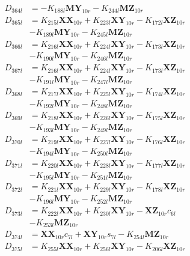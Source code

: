 \begin{multicols}{2}
\begin{align}
D_{364l} &= - K_{188l}\mathbf{MY}_{10r} - K_{244l}\mathbf{MZ}_{10r} \nonumber \\
D_{365l} &= K_{215l}\mathbf{XX}_{10r} + K_{223l}\mathbf{XY}_{10r} - K_{172l}\mathbf{XZ}_{10r}  \nonumber \\
&- K_{189l}\mathbf{MY}_{10r} - K_{245l}\mathbf{MZ}_{10r} \nonumber \\
D_{366l} &= K_{216l}\mathbf{XX}_{10r} + K_{224l}\mathbf{XY}_{10r} - K_{173l}\mathbf{XZ}_{10r}  \nonumber \\
&- K_{190l}\mathbf{MY}_{10r} - K_{246l}\mathbf{MZ}_{10r} \nonumber \\
D_{367l} &= K_{216l}\mathbf{XX}_{10r} + K_{224l}\mathbf{XY}_{10r} - K_{173l}\mathbf{XZ}_{10r}  \nonumber \\
&- K_{191l}\mathbf{MY}_{10r} - K_{247l}\mathbf{MZ}_{10r} \nonumber \\
D_{368l} &= K_{217l}\mathbf{XX}_{10r} + K_{225l}\mathbf{XY}_{10r} - K_{174l}\mathbf{XZ}_{10r}  \nonumber \\
&- K_{192l}\mathbf{MY}_{10r} - K_{248l}\mathbf{MZ}_{10r} \nonumber \\
D_{369l} &= K_{218l}\mathbf{XX}_{10r} + K_{226l}\mathbf{XY}_{10r} - K_{175l}\mathbf{XZ}_{10r}  \nonumber \\
&- K_{193l}\mathbf{MY}_{10r} - K_{249l}\mathbf{MZ}_{10r} \nonumber \\
D_{370l} &= K_{219l}\mathbf{XX}_{10r} + K_{227l}\mathbf{XY}_{10r} - K_{176l}\mathbf{XZ}_{10r}  \nonumber \\
&- K_{194l}\mathbf{MY}_{10r} - K_{250l}\mathbf{MZ}_{10r} \nonumber \\
D_{371l} &= K_{220l}\mathbf{XX}_{10r} + K_{228l}\mathbf{XY}_{10r} - K_{177l}\mathbf{XZ}_{10r}  \nonumber \\
&- K_{195l}\mathbf{MY}_{10r} - K_{251l}\mathbf{MZ}_{10r} \nonumber \\
D_{372l} &= K_{221l}\mathbf{XX}_{10r} + K_{229l}\mathbf{XY}_{10r} - K_{178l}\mathbf{XZ}_{10r}  \nonumber \\
&- K_{196l}\mathbf{MY}_{10r} - K_{252l}\mathbf{MZ}_{10r} \nonumber \\
D_{373l} &= K_{222l}\mathbf{XX}_{10r} + K_{230l}\mathbf{XY}_{10r} - \mathbf{XZ}_{10r}c_{6l}  \nonumber \\
&- K_{253l}\mathbf{MZ}_{10r} \nonumber \\
D_{374l} &= \mathbf{XX}_{10r}c_{7l} + \mathbf{XY}_{10r}s_{7l} - K_{254l}\mathbf{MZ}_{10r} \nonumber \\
D_{375l} &= K_{255l}\mathbf{XX}_{10r} + K_{256l}\mathbf{XY}_{10r} - K_{206l}\mathbf{XZ}_{10r}  \nonumber \\

\end{align}
\end{multicols}
